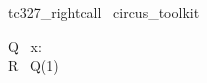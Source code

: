 
\begin{zsection}
  \SECTION\ tc327\_rightcall \parents\ circus\_toolkit
\end{zsection}

\begin{circus}
    \circprocess\ Q \circdef\  x: \nat \circspot \circbegin \circspot \Skip \circend \\
    \circprocess\ R \circdef\ Q(1) 
\end{circus}

